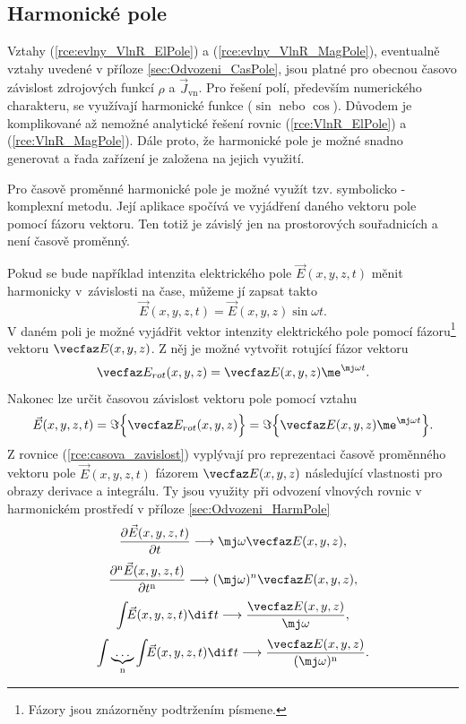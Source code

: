 \subsection{Harmonické pole}
Vztahy (\ref{rce:evlny_VlnR_ElPole}) a (\ref{rce:evlny_VlnR_MagPole}), eventualně vztahy uvedené v příloze \ref{sec:Odvozeni_CasPole}, jsou platné pro obecnou časovo závislost zdrojových funkcí $\rho$ a $\vec J_{\mathrm{vn}}$. Pro řešení polí, především numerického charakteru, se využívají harmonické funkce ($\sin$ nebo $\cos$). Důvodem je komplikované až nemožné analytické řešení rovnic (\ref{rce:VlnR_ElPole}) a (\ref{rce:VlnR_MagPole}). Dále proto, že harmonické pole je možné snadno generovat a řada zařízení je založena na jejich využití. 

Pro časově proměnné harmonické pole je možné využít tzv. symbolicko - komplexní metodu. Její aplikace spočívá ve vyjádření daného vektoru pole pomocí fázoru vektoru. Ten totiž je závislý jen na prostorových souřadnicích a není časově proměnný.

Pokud se bude například intenzita elektrického pole $\vec E(x,y,z,t)$ měnit harmonicky v~závislosti na čase, můžeme jí zapsat takto
\begin{displaymath}
	\vec E(x,y,z,t) = \vec E(x,y,z)\sin\omega t.
\end{displaymath}
V daném poli je možné vyjádřit vektor intenzity elektrického pole pomocí fázoru\footnote{Fázory jsou znázorněny podtržením písmene.} vektoru $\vecfaz E(x,y,z)$. Z něj je možné vytvořit rotující fázor vektoru
\begin{equation}
	\vecfaz E_{rot}(x,y,z) = \vecfaz E(x,y,z)\me^{\mj\omega t}.
	\label{rce:rotujici_fazor_vektoru}
\end{equation}
Nakonec lze určit časovou závislost vektoru pole pomocí vztahu
\begin{equation}
	\vec E(x,y,z,t) = \Im\Big\{ \vecfaz E_{rot}(x,y,z)\Big\} = \Im\Big\{ \vecfaz E(x,y,z)\me^{\mj\omega t}\Big\}.
	\label{rce:casova_zavislost}
\end{equation}
Z rovnice (\ref{rce:casova_zavislost}) vyplývají pro reprezentaci časově proměnného vektoru pole $\vec E(x,y,z,t)$ fázorem $\vecfaz E(x,y,z)$ následující vlastnosti pro obrazy derivace a integrálu. Ty jsou využity při odvození vlnových rovnic v harmonickém prostředí v příloze \ref{sec:Odvozeni_HarmPole}
\begin{displaymath}
	\frac{\partial \vec E(x,y,z,t)}{\partial t} \longrightarrow \mj\omega \vecfaz E(x,y,z),
\end{displaymath}
\begin{displaymath}
	\frac{\partial^{\mathrm{n}} \vec E(x,y,z,t)}{\partial t^{\mathrm{n}}} \longrightarrow (\mj\omega)^{n} \vecfaz E(x,y,z),
\end{displaymath}
\begin{displaymath}
	\int\!\!\vec E(x,y,z,t) \dif t \longrightarrow \frac{\vecfaz E(x,y,z)}{\mj\omega},
\end{displaymath}
\begin{displaymath}
	\int\underbrace{\ldots}_{\mathrm{n}}\int\!\!\vec E(x,y,z,t) \dif t \longrightarrow \frac{\vecfaz E(x,y,z)}{(\mj\omega)^{\mathrm{n}}}.
\end{displaymath}

